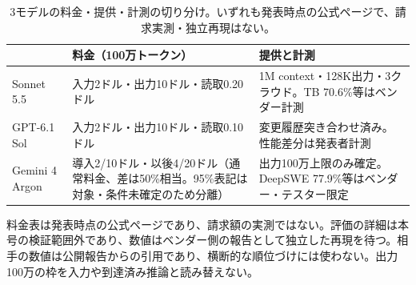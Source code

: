 \begin{table}[h]
\centering\footnotesize
\begin{tabularx}{0.98\linewidth}{@{}lXX@{}}
\toprule
 & 料金（100万トークン） & 提供と計測 \\
\midrule
Sonnet 5.5 & 入力2ドル・出力10ドル・読取0.20ドル & 1M context・128K出力・3クラウド。TB 70.6\%等はベンダー計測 \\
GPT-6.1 Sol & 入力2ドル・出力10ドル・読取0.10ドル & 変更履歴突き合わせ済み。性能差分は発表者計測 \\
Gemini 4 Argon & 導入2/10ドル・以後4/20ドル（通常料金、差は50\%相当。95\%表記は対象・条件未確定のため分離） & 出力100万上限のみ確定。DeepSWE 77.9\%等はベンダー・テスター限定 \\
\bottomrule
\end{tabularx}
\caption{3モデルの料金・提供・計測の切り分け。いずれも発表時点の公式ページで、請求実測・独立再現はない。}
\end{table}

\begin{claimboundary}[資料と評価の境界]
料金表は発表時点の公式ページであり、請求額の実測ではない。評価の詳細は本号の検証範囲外であり、数値はベンダー側の報告として独立した再現を待つ。相手の数値は公開報告からの引用であり、横断的な順位づけには使わない。出力100万の枠を入力や到達済み推論と読み替えない。
\end{claimboundary}

